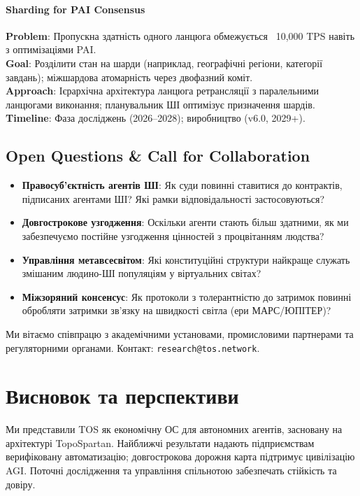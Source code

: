 \documentclass[11pt]{article}
\begin{document}
\paragraph{Sharding for PAI Consensus}
\textbf{Problem}: Пропускна здатність одного ланцюга обмежується ~10,000 TPS навіть з оптимізаціями PAI.\\
\textbf{Goal}: Розділити стан на шарди (наприклад, географічні регіони, категорії завдань); міжшардова атомарність через двофазний коміт.\\
\textbf{Approach}: Ієрархічна архітектура ланцюга ретрансляції з паралельними ланцюгами виконання; планувальник ШІ оптимізує призначення шардів.\\
\textbf{Timeline}: Фаза досліджень (2026--2028); виробництво (v6.0, 2029+).

\subsection{Open Questions \& Call for Collaboration}

\begin{itemize}[noitemsep]
  \item \textbf{Правосуб'єктність агентів ШІ}: Як суди повинні ставитися до контрактів, підписаних агентами ШІ? Які рамки відповідальності застосовуються?
  \item \textbf{Довгострокове узгодження}: Оскільки агенти стають більш здатними, як ми забезпечуємо постійне узгодження цінностей з процвітанням людства?
  \item \textbf{Управління метавсесвітом}: Які конституційні структури найкраще служать змішаним людино-ШІ популяціям у віртуальних світах?
  \item \textbf{Міжзоряний консенсус}: Як протоколи з толерантністю до затримок повинні обробляти затримки зв'язку на швидкості світла (ери МАРС/ЮПІТЕР)?
\end{itemize}

Ми вітаємо співпрацю з академічними установами, промисловими партнерами та регуляторними органами. Контакт: \texttt{research@tos.network}.

\section{Висновок та перспективи}
Ми представили TOS як економічну ОС для автономних агентів, засновану на архітектурі TopoSpartan. Найближчі результати надають підприємствам верифіковану автоматизацію; довгострокова дорожня карта підтримує цивілізацію AGI. Поточні дослідження та управління спільнотою забезпечать стійкість та довіру.
\end{document}
